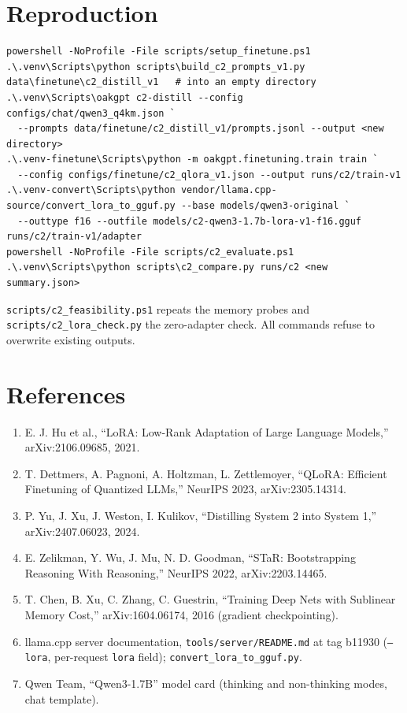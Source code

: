 \documentclass[11pt,a4paper]{article}
\newcommand{\code}[1]{\texttt{#1}}
\begin{document}
\section{Reproduction}

\begin{Verbatim}[fontsize=\footnotesize]
powershell -NoProfile -File scripts/setup_finetune.ps1
.\.venv\Scripts\python scripts\build_c2_prompts_v1.py data\finetune\c2_distill_v1   # into an empty directory
.\.venv\Scripts\oakgpt c2-distill --config configs/chat/qwen3_q4km.json `
  --prompts data/finetune/c2_distill_v1/prompts.jsonl --output <new directory>
.\.venv-finetune\Scripts\python -m oakgpt.finetuning.train train `
  --config configs/finetune/c2_qlora_v1.json --output runs/c2/train-v1
.\.venv-convert\Scripts\python vendor/llama.cpp-source/convert_lora_to_gguf.py --base models/qwen3-original `
  --outtype f16 --outfile models/c2-qwen3-1.7b-lora-v1-f16.gguf runs/c2/train-v1/adapter
powershell -NoProfile -File scripts/c2_evaluate.ps1
.\.venv\Scripts\python scripts\c2_compare.py runs/c2 <new summary.json>
\end{Verbatim}

\code{scripts/c2\_feasibility.ps1} repeats the memory probes and \code{scripts/c2\_lora\_check.py} the zero-adapter check. All commands refuse to overwrite existing outputs.

\section*{References}

\begin{enumerate}
\item E. J. Hu et al., ``LoRA: Low-Rank Adaptation of Large Language Models,'' arXiv:2106.09685, 2021.
\item T. Dettmers, A. Pagnoni, A. Holtzman, L. Zettlemoyer, ``QLoRA: Efficient Finetuning of Quantized LLMs,'' NeurIPS 2023, arXiv:2305.14314.
\item P. Yu, J. Xu, J. Weston, I. Kulikov, ``Distilling System 2 into System 1,'' arXiv:2407.06023, 2024.
\item E. Zelikman, Y. Wu, J. Mu, N. D. Goodman, ``STaR: Bootstrapping Reasoning With Reasoning,'' NeurIPS 2022, arXiv:2203.14465.
\item T. Chen, B. Xu, C. Zhang, C. Guestrin, ``Training Deep Nets with Sublinear Memory Cost,'' arXiv:1604.06174, 2016 (gradient checkpointing).
\item llama.cpp server documentation, \code{tools/server/README.md} at tag b11930 (\code{--lora}, per-request \code{lora} field); \code{convert\_lora\_to\_gguf.py}.
\item Qwen Team, ``Qwen3-1.7B'' model card (thinking and non-thinking modes, chat template).
\end{enumerate}
\end{document}
